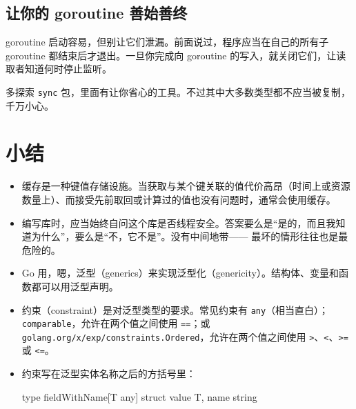 \subsection{让你的 goroutine 善始善终}

goroutine 启动容易，但别让它们泄漏。前面说过，程序应当在自己的所有子 goroutine 都结束后才退出。一旦你完成向 goroutine 的写入，就关闭它们，让读取者知道何时停止监听。

多探索 \texttt{sync} 包，里面有让你省心的工具。不过其中大多数类型都不应当被复制，千万小心。

\section*{小结}

\begin{itemize}
\item 缓存是一种键值存储设施。当获取与某个键关联的值代价高昂（时间上或资源数量上）、而接受先前取回或计算过的值也没有问题时，通常会使用缓存。
\item 编写库时，应当始终自问这个库是否线程安全。答案要么是``是的，而且我知道为什么''，要么是``不，它不是''。没有中间地带——
最坏的情形往往也是最危险的。
\item Go 用，嗯，泛型（generics）来实现泛型化（genericity）。结构体、变量和函数都可以用泛型声明。
\item 约束（constraint）是对泛型类型的要求。常见约束有 \texttt{any}（相当直白）；\texttt{comparable}，允许在两个值之间使用 \texttt{==}；或 \texttt{golang.org/x/exp/constraints.Ordered}，允许在两个值之间使用 \texttt{>}、\texttt{<}、\texttt{>=} 或 \texttt{<=}。
\item 约束写在泛型实体名称之后的方括号里：

\begin{gocode}[]
type fieldWithName[T any] struct { value T, name string }


\end{gocode}
\end{itemize}
